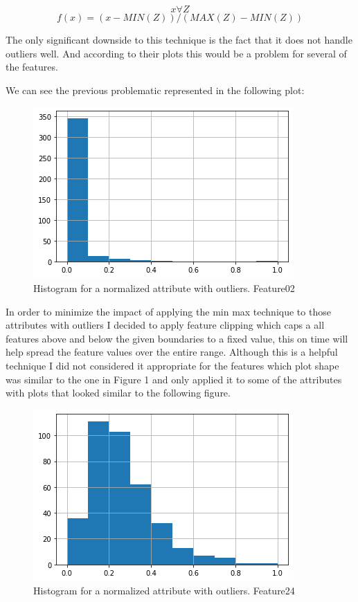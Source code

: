 \documentclass[12pt, a4paper]{article}
\begin{document}
	\[ x \forall Z \]
	\[ f(x) = (x - MIN(Z))/(MAX(Z)-MIN(Z)) \]
	
	The only significant downside to this technique is the fact that it does not handle outliers well. And according to their plots this would be a problem for several of the features.
	
	We can see the previous problematic represented in the following plot:
	
	\begin{figure}[h]
		\label{Feature02N}
		\includegraphics{img/plots/feature02N.png}
		\caption{Histogram for a normalized attribute with outliers. Feature02}
	\end{figure}
	
	In order to minimize the impact of applying the min max technique to those attributes with outliers I decided to apply feature clipping which caps a all features above and below the given boundaries to a fixed value, this on time will help spread the feature values over the entire range. Although this is a helpful technique I did not considered it appropriate for the features which plot shape was similar to the one in Figure 1 and only applied it to some of the attributes with plots that looked similar to the following figure.
	
	\begin{figure}[h]
		\label{Feature24N}
		\includegraphics{img/plots/feature24N.png}
		\caption{Histogram for a normalized attribute with outliers. Feature24}
	\end{figure}
\end{document}
